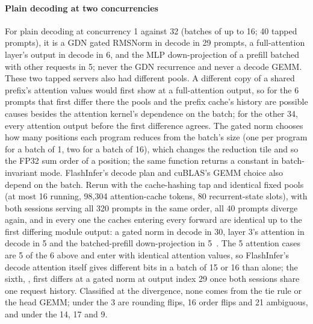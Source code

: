 \paragraph{Plain decoding at two concurrencies} For plain decoding at concurrency 1 against 32 (batches of up to 16; 40 tapped prompts), it is a GDN gated RMSNorm in decode in 29 prompts, a full-attention layer's output in decode in 6, and the MLP down-projection of a prefill batched with other requests in 5; never the GDN recurrence and never a decode GEMM. These two tapped servers also had different pools. A different copy of a shared prefix's attention values would first show at a full-attention output, so for the 6 prompts that first differ there the pools and the prefix cache's history are possible causes besides the attention kernel's dependence on the batch; for the other 34, every attention output before the first difference agrees. The gated norm chooses how many positions each program reduces from the batch's size (one per program for a batch of 1, two for a batch of 16), which changes the reduction tile and so the FP32 sum order of a position; the same function returns a constant in batch-invariant mode. FlashInfer's decode plan and cuBLAS's GEMM choice also depend on the batch. Rerun with the cache-hashing tap and identical fixed pools (at most 16 running, 98,304 attention-cache tokens, 80 recurrent-state slots), with both sessions serving all 320 prompts in the same order, all 40 prompts diverge again, and in every one the caches entering every forward are identical up to the first differing module output: a gated norm in decode in 30, layer 3's attention in decode in 5 and the batched-prefill down-projection in 5~. The 5 attention cases are 5 of the 6 above and enter with identical attention values, so FlashInfer's decode attention itself gives different bits in a batch of 15 or 16 than alone; the sixth, , first differs at a gated norm at output index 29 once both sessions share one request history. Classified at the divergence, none comes from the tie rule or the head GEMM; under the \modelcons{} 3 are rounding flips, 16 order flips and 21 ambiguous, and under the \modelhopper{} 14, 17 and 9.

